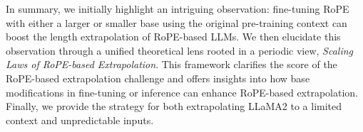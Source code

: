 In summary, we initially highlight an intriguing observation: fine-tuning RoPE \citep{su2021roformer} with either a larger or smaller base using the original pre-training context can boost the length extrapolation of RoPE-based LLMs. We then elucidate this observation through a unified theoretical lens rooted in a periodic view, \textit{Scaling Laws of RoPE-based Extrapolation}. This framework clarifies the score of the RoPE-based extrapolation challenge and offers insights into how base modifications in fine-tuning or inference can enhance RoPE-based extrapolation. Finally, we provide the strategy for both extrapolating LLaMA2 \citep{touvron2023llama2} to a limited context and unpredictable inputs.


